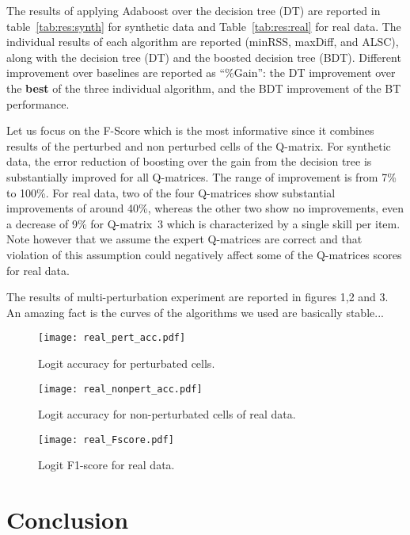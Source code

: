 \documentclass{edm_template}
\begin{document}
The results of applying Adaboost over the decision tree (DT) are reported in table~\ref{tab:res:synth} for synthetic data and Table~\ref{tab:res:real} for real data. The individual results of each algorithm are reported (minRSS, maxDiff, and ALSC), along with the decision tree (DT) and the boosted decision tree (BDT).  Different improvement over baselines are reported as ``\%Gain'': the DT improvement over the \textbf{best} of the three individual algorithm, and the BDT improvement of the BT performance.

Let us focus on the F-Score which is the most informative since it combines results of the perturbed and non perturbed cells of the Q-matrix.  For synthetic data, the error reduction of boosting over the gain from the decision tree is substantially improved for all Q-matrices. The range of improvement is from 7\% to 100\%.  For real data, two of the four Q-matrices show substantial improvements of around 40\%, whereas the other two show no improvements, even a decrease of 9\% for Q-matrix~3 which is characterized by a single skill per item.  Note however that we assume the expert Q-matrices are correct and that violation of this assumption could negatively affect some of the Q-matrices scores for real data.

The results of multi-perturbation experiment are reported in figures 1,2 and 3. An amazing fact is the curves of the algorithms we used are basically stable...
\begin{figure*}
  \centering
    \texttt{[image: real\_pert\_acc.pdf]}
  \caption{Logit accuracy for perturbated cells.}\label{fig:acc-pert}
\end{figure*}

\begin{figure*}
  \centering
    \texttt{[image: real\_nonpert\_acc.pdf]}
  \caption{Logit accuracy for non-perturbated cells of real data.}\label{fig:acc-non-pert}
\end{figure*}

\begin{figure*}
  \caption{Logit F1-score for real data.}
  \centering
    \texttt{[image: real\_Fscore.pdf]}
\end{figure*}


\section{Conclusion}
\end{document}
